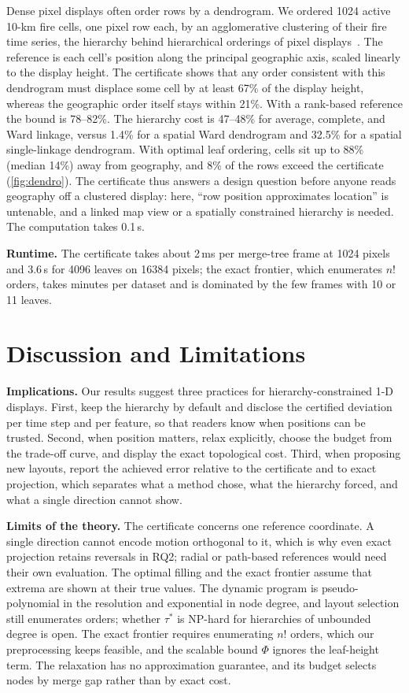 \documentclass[review]{vgtc}                 %
\begin{document}
Dense pixel displays often order rows by a dendrogram. We ordered 1024 active 10-km fire cells, one pixel row each, by an agglomerative clustering of their fire time series, the hierarchy behind hierarchical orderings of pixel displays~\cite{Franke:2021:1DP}. The reference is each cell's position along the principal geographic axis, scaled linearly to the display height. The certificate shows that any order consistent with this dendrogram must displace some cell by at least 67\% of the display height, whereas the geographic order itself stays within 21\%. With a rank-based reference the bound is 78--82\%. The hierarchy cost is 47--48\% for average, complete, and Ward linkage, versus 1.4\% for a spatial Ward dendrogram and 32.5\% for a spatial single-linkage dendrogram. With optimal leaf ordering, cells sit up to 88\% (median 14\%) away from geography, and 8\% of the rows exceed the certificate (\cref{fig:dendro}). The certificate thus answers a design question before anyone reads geography off a clustered display: here, ``row position approximates location'' is untenable, and a linked map view or a spatially constrained hierarchy is needed. The computation takes 0.1\,s.

\textbf{Runtime.} The certificate takes about 2\,ms per merge-tree frame at 1024 pixels and 3.6\,s for 4096 leaves on 16384 pixels; the exact frontier, which enumerates $n!$ orders, takes minutes per dataset and is dominated by the few frames with 10 or 11 leaves.

\section{Discussion and Limitations}\label{sec:discussion}

\textbf{Implications.} Our results suggest three practices for hierarchy-constrained 1-D displays. First, keep the hierarchy by default and disclose the certified deviation per time step and per feature, so that readers know when positions can be trusted. Second, when position matters, relax explicitly, choose the budget from the trade-off curve, and display the exact topological cost. Third, when proposing new layouts, report the achieved error relative to the certificate and to exact projection, which separates what a method chose, what the hierarchy forced, and what a single direction cannot show.

\textbf{Limits of the theory.} The certificate concerns one reference coordinate. A single direction cannot encode motion orthogonal to it, which is why even exact projection retains reversals in RQ2; radial or path-based references would need their own evaluation. The optimal filling and the exact frontier assume that extrema are shown at their true values. The dynamic program is pseudo-polynomial in the resolution and exponential in node degree, and layout selection still enumerates orders; whether $\tau^*$ is NP-hard for hierarchies of unbounded degree is open. The exact frontier requires enumerating $n!$ orders, which our preprocessing keeps feasible, and the scalable bound $\Phi$ ignores the leaf-height term. The relaxation has no approximation guarantee, and its budget selects nodes by merge gap rather than by exact cost.
\end{document}
